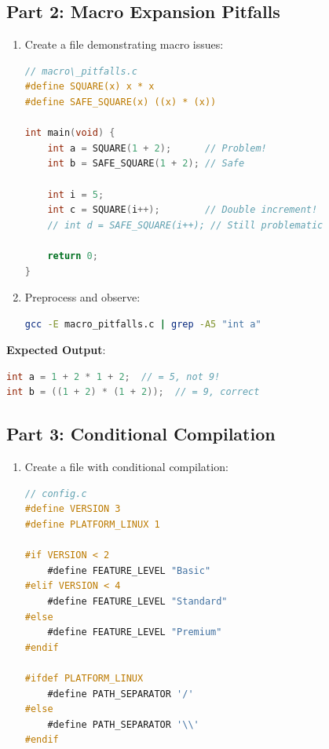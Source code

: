 \begin{experiment}
\subsection{Part 2: Macro Expansion Pitfalls}

\begin{enumerate}
    \item Create a file demonstrating macro issues:

\begin{lstlisting}[language=C]
// macro\_pitfalls.c
#define SQUARE(x) x * x
#define SAFE_SQUARE(x) ((x) * (x))

int main(void) {
    int a = SQUARE(1 + 2);      // Problem!
    int b = SAFE_SQUARE(1 + 2); // Safe

    int i = 5;
    int c = SQUARE(i++);        // Double increment!
    // int d = SAFE_SQUARE(i++); // Still problematic

    return 0;
}
\end{lstlisting}

    \item Preprocess and observe:

\begin{lstlisting}[language=bash]
gcc -E macro_pitfalls.c | grep -A5 "int a"
\end{lstlisting}
\end{enumerate}

\textbf{Expected Output}:
\begin{lstlisting}[language=C]
int a = 1 + 2 * 1 + 2;  // = 5, not 9!
int b = ((1 + 2) * (1 + 2));  // = 9, correct
\end{lstlisting}

\subsection{Part 3: Conditional Compilation}

\begin{enumerate}
    \item Create a file with conditional compilation:

\begin{lstlisting}[language=C]
// config.c
#define VERSION 3
#define PLATFORM_LINUX 1

#if VERSION < 2
    #define FEATURE_LEVEL "Basic"
#elif VERSION < 4
    #define FEATURE_LEVEL "Standard"
#else
    #define FEATURE_LEVEL "Premium"
#endif

#ifdef PLATFORM_LINUX
    #define PATH_SEPARATOR '/'
#else
    #define PATH_SEPARATOR '\\'
#endif


\end{lstlisting}
\end{enumerate}
\end{experiment}
